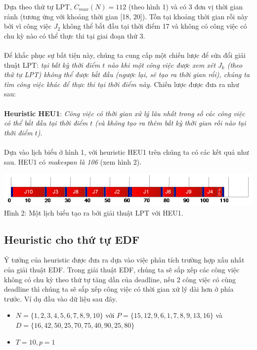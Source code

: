 \documentclass[a4paper,12pt]{article}
\begin{document}
Dựa theo thứ tự LPT, $C_{max}(N) = 112$ (theo hình 1) và có 3 đơn vị thời gian rảnh (tương ứng với khoảng thời gian [18, 20]). Tồn tại khoảng thời gian rỗi này bởi vì công việc $J_2$ không thể bắt đầu tại thời điểm 17 và không có công việc có chu kỳ nào có thể thực thi tại giai đoạn thứ 3.\\\\
Để khắc phục sự bất tiện này, chúng ta cung cấp một chiến lược để sửa đổi giải thuật LPT: \textit{tại bất kỳ thời điểm $t$ nào khi một công việc được xem xét $J_k$ (theo thứ tự LPT) không thể được bắt đầu (ngược lại, sẽ tạo ra thời gian rổi), chúng ta tìm công việc khác để thực thi tại thời điểm này.} Chiến lược được đưa ra như sau:\\\\
\textbf{Heuristic HEU1}: \textit{Công việc có thời gian xử lý lâu nhất trong số các công việc có thể bắt đầu tại thời điểm $t$ (và không tạo ra thêm bất kỳ thời gian rỗi nào tại thời điểm $t$)}.\\\\
Dựa vào lịch biểu ở hình 1, với heuristic HEU1 trên chúng ta có các kết quả như sau. HEU1 có \textit{makespan là 106} (xem hình 2).
\begin{center}
\includegraphics[scale=0.65]{Fig_2.png}
\\
Hình 2: Một lịch biểu tạo ra bởi giải thuật LPT với HEU1.
\end{center}
\subsection{Heuristic cho thứ tự EDF}
Ý tưởng của heuristic được đưa ra dựa vào việc phân tích trường hợp xấu nhất của giải thuật EDF. Trong giải thuật EDF, chúng ta sẽ sắp xếp các công việc không có chu kỳ theo thứ tự tăng dần của deadline, nếu 2 công việc có cùng deadline thì chúng ta sẽ sắp xếp công việc có thời gian xử lý dài hơn ở phía trước. Ví dụ đầu vào dữ liệu sau đây.

\begin{itemize}
\item
$N = \{1, 2, 3, 4, 5, 6, 7, 8, 9, 10\}$ với $P = \{15, 12, 9, 6, 1, 7, 8, 9, 13, 16\}$ và\\ $D = \{16, 42, 50, 25, 70, 75, 40, 90, 25, 80\}$
\item
$T = 10, p = 1$
\end{itemize}
\end{document}

